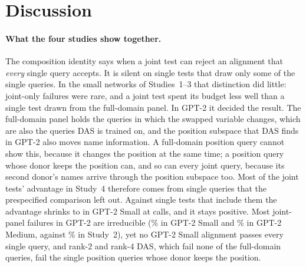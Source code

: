 \section{Discussion}\label{sec:discussion}

\paragraph{What the four studies show together.}
The composition identity says when a joint test can reject an alignment that \emph{every} single query accepts. It is
silent on single tests that draw only some of the single queries. In the small networks of Studies~1--3 that
distinction did little: joint-only failures were rare, and a joint test spent its budget less well than a single test
drawn from the full-domain panel. In GPT-2 it decided the result. The full-domain panel holds the queries in which the
swapped variable changes, which are also the queries DAS is trained on, and the position subspace that DAS finds in
GPT-2 also moves name information. A full-domain position query cannot show this, because it changes the position at
the same time; a position query whose donor keeps the position can, and so can every joint query, because its second
donor's names arrive through the position subspace too. Most of the joint tests' advantage in Study~4 therefore comes
from single queries that the prespecified comparison left out. Against single tests that include them the advantage
shrinks to \ContrastAllS{} in GPT-2 Small at \Budget{} calls, and it stays positive. Most joint-panel failures in GPT-2
are irreducible (\IrrShareS\% in GPT-2 Small and \IrrShareM\% in GPT-2 Medium, against \TrnIrrShare\% in Study~2),
yet no GPT-2 Small alignment passes every single query, and rank-2 and rank-4 DAS, which fail none of the full-domain
queries, fail the single position queries whose donor keeps the position.

